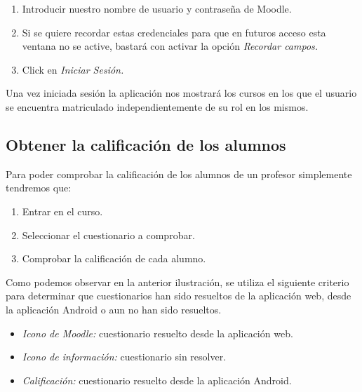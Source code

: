 \begin{enumerate}
	\item Introducir nuestro nombre de usuario y contraseña de Moodle.
	\item Si se quiere recordar estas credenciales para que en futuros acceso esta ventana no se active, bastará con activar la opción \emph{Recordar campos.}
	\item Click en \emph{Iniciar Sesión.}
\end{enumerate}

Una vez iniciada sesión la aplicación nos mostrará los cursos en los que el usuario se encuentra matriculado independientemente de su rol en los mismos.




\subsection{Obtener la calificación de los alumnos}

Para poder comprobar la calificación de los alumnos de un profesor simplemente tendremos que:

\begin{enumerate}
	\item Entrar en el curso.
	\item Seleccionar el cuestionario a comprobar.
	\item Comprobar la calificación de cada alumno.
\end{enumerate}


Como podemos observar en la anterior ilustración, se utiliza el siguiente criterio para determinar que cuestionarios han sido resueltos de la aplicación web, desde la aplicación Android o aun no han sido resueltos.

\begin{itemize}
	\item \emph{Icono de Moodle:} cuestionario resuelto desde la aplicación web.
	
	\item \emph{Icono de información:} cuestionario sin resolver.
	
	\item \emph{Calificación:} cuestionario resuelto desde la aplicación Android.
\end{itemize}

